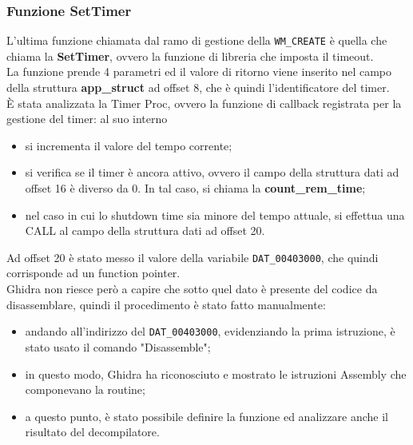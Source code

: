 \documentclass[12pt]{extarticle}
\begin{document}
\subsubsection{Funzione SetTimer}
L'ultima funzione chiamata dal ramo di gestione della \texttt{WM\_CREATE} è quella che chiama la \textbf{SetTimer}, ovvero la funzione di libreria che imposta il timeout.\\La funzione prende 4 parametri ed il valore di ritorno viene inserito nel campo della struttura \textbf{app\_struct} ad offset 8, che è quindi l'identificatore del timer.\\È stata analizzata la Timer Proc, ovvero la funzione di callback registrata per la gestione del timer: al suo interno
\begin{itemize}
\item si incrementa il valore del tempo corrente;
\item si verifica se il timer è ancora attivo, ovvero il campo della struttura dati ad offset 16 è diverso da 0. In tal caso, si chiama la \textbf{count\_rem\_time};
\item nel caso in cui lo shutdown time sia minore del tempo attuale, si effettua una CALL al campo della struttura dati ad offset 20.
\end{itemize}
Ad offset 20 è stato messo il valore della variabile \texttt{DAT\_00403000}, che quindi corrisponde ad un function pointer.\\Ghidra non riesce però a capire che sotto quel dato è presente del codice da disassemblare, quindi il procedimento è stato fatto manualmente:
\begin{itemize}
\item andando all'indirizzo del \texttt{DAT\_00403000}, evidenziando la prima istruzione, è stato usato il comando "Disassemble";
\item in questo modo, Ghidra ha riconosciuto e mostrato le istruzioni Assembly che componevano la routine;
\item a questo punto, è stato possibile definire la funzione ed analizzare anche il risultato del decompilatore.
\end{itemize}
\end{document}
